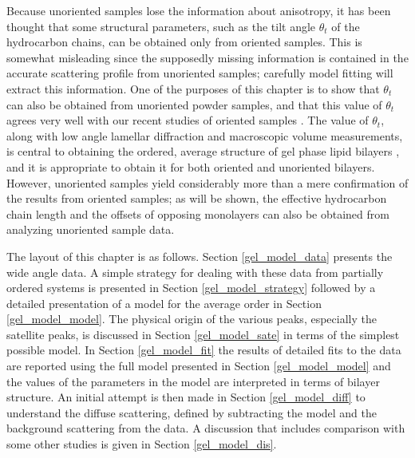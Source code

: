 Because unoriented samples lose the information about anisotropy,
it has been thought that some structural parameters, such as the tilt 
angle ${\theta}_{t}$ of the hydrocarbon chains, can be obtained only from
oriented samples. This is somewhat misleading since the supposedly
missing information is contained in the accurate scattering profile
from unoriented samples; carefully model fitting will extract this
information.  One of the purposes of this chapter is to show 
that ${\theta}_{t}$ can also be obtained from unoriented powder samples, 
and that this value of ${\theta}_{t}$ agrees very well with our recent 
studies of oriented samples \cite{STN92}. The value of ${\theta}_{t}$, 
along with low angle lamellar diffraction and macroscopic volume 
measurements, is central to obtaining the ordered, average structure of 
gel phase lipid bilayers \cite{WSN89}, and it is appropriate to obtain 
it for both oriented and unoriented bilayers. However, unoriented samples 
yield considerably more than a mere confirmation of the results from 
oriented samples; as will be shown, the effective hydrocarbon chain
length and the offsets of opposing monolayers can also be obtained from
analyzing unoriented sample data.  

The layout of this chapter is as follows.  Section \ref{gel_model_data} 
presents the wide angle data.  A simple strategy for dealing with these data
from partially ordered systems is presented in Section \ref{gel_model_strategy} 
followed by a detailed presentation of a model for the average order in 
Section \ref{gel_model_model}.  The physical origin of the various peaks,
especially the satellite peaks, is discussed in Section \ref{gel_model_sate}
in terms of the simplest possible model.  In Section \ref{gel_model_fit} the 
results of detailed fits to the data are reported using the full model 
presented in Section \ref{gel_model_model} and the values of the parameters 
in the model are interpreted in terms of bilayer structure.  An initial 
attempt is then made in Section \ref{gel_model_diff} to understand the 
diffuse scattering, defined by subtracting the model and the background 
scattering from the data. A discussion that includes comparison with 
some other studies is given in Section \ref{gel_model_dis}.
